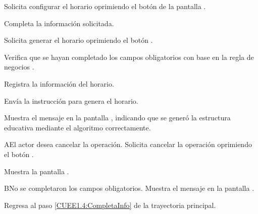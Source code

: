 \begin{UCtrayectoria}
	\UCpaso [\UCactor] Solicita configurar el horario oprimiendo el botón  de la pantalla .
	
	\UCpaso [\UCactor] Completa la información solicitada. \label{CUEE1.4:CompletaInfo}

	\UCpaso [\UCactor] Solicita generar el horario oprimiendo el botón . 

	\UCpaso [\UCsist] Verifica que se hayan completado los campos obligatorios con base en la regla de negocios . 

	\UCpaso [\UCsist] Registra la información del horario.
	
	\UCpaso [\UCsist] Envía la instrucción para genera el horario.

	\UCpaso [\UCsist] Muestra el mensaje  en la pantalla , indicando que se generó la estructura educativa mediante el algoritmo correctamente.
	
\end{UCtrayectoria}


\begin{UCtrayectoriaA}{A}{El actor desea cancelar la operación.}
	\UCpaso [\UCactor] Solicita cancelar la operación oprimiendo el botón .
	
	\UCpaso [\UCsist] Muestra la pantalla . 
\end{UCtrayectoriaA}

\begin{UCtrayectoriaA}{B}{No se completaron los campos obligatorios.}
	\UCpaso [\UCsist] Muestra el mensaje  en la pantalla .
	
	\UCpaso Regresa al paso \ref{CUEE1.4:CompletaInfo} de la trayectoria principal.
\end{UCtrayectoriaA}
